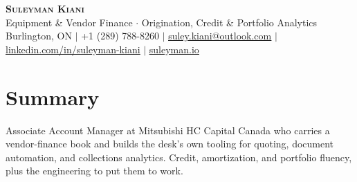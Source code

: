 \documentclass[letterpaper,11pt]{article}
\begin{document}
\begin{center}
    \textbf{\Huge \scshape Suleyman Kiani} \\ \vspace{3pt}
    \small Equipment \& Vendor Finance $\cdot$ Origination, Credit \& Portfolio Analytics \\ \vspace{3pt}
    \small Burlington, ON $|$ +1 (289) 788-8260 $|$ \href{mailto:suley.kiani@outlook.com}{\underline{suley.kiani@outlook.com}} $|$ \href{https://www.linkedin.com/in/suleyman-kiani}{\underline{linkedin.com/in/suleyman-kiani}} $|$ \href{https://suleyman.io}{\underline{suleyman.io}}
\end{center}

\section{Summary}
\vspace{2pt}
\small{Associate Account Manager at Mitsubishi HC Capital Canada who carries a vendor-finance book and builds the desk's own tooling for quoting, document automation, and collections analytics. Credit, amortization, and portfolio fluency, plus the engineering to put them to work.}
\vspace{-4pt}

\end{document}
